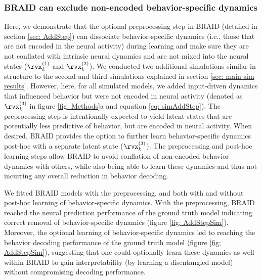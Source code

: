 \documentclass{article} %
\newcommand{\ourmethod}{BRAID}
\begin{document}
\subsubsection{\ourmethod{} can exclude non-encoded behavior-specific dynamics}\label{sec: AddStepResults}
Here, we demonstrate that the optional preprocessing step in \ourmethod{} (detailed in section \ref{sec: AddStep}) can dissociate behavior-specific dynamics (i.e., those that are not encoded in the neural activity) during learning and make sure they are not conflated with intrinsic neural dynamics and are not mixed into the neural states (\(\rvx_k^{(1)}\) and \(\rvx_k^{(2)}\)). We conducted two additional simulations similar in structure to the second and third simulations explained in section \ref{sec: main sim results}. However, here, for all simulated models, we added input-driven dynamics that influenced behavior but were not encoded in neural activity (denoted as \(\rvx_k^{(3)}\) in figure \ref{fig: Methods}a and equation \ref{eq: simAddStep}). The preprocessing step is intentionally expected to yield latent states that are potentially less predictive of behavior, but are encoded in neural activity. When desired, \ourmethod{} provides the option to further learn behavior-specific dynamics post-hoc with a separate latent state (\(\rvx_k^{(3)}\)). The preprocessing and post-hoc learning steps allow \ourmethod{} to avoid conflation of non-encoded behavior dynamics with others, while also being able to learn these dynamics and thus not incurring any overall reduction in behavior decoding. 

We fitted \ourmethod{} models with the preprocessing, and both with and without post-hoc learning of behavior-specific dynamics. With the preprocessing, \ourmethod{} reached the neural prediction performance of the ground truth model indicating correct removal of behavior-specific dynamics (figure \ref{fig: AddStepSim}). Moreover, the optional learning of behavior-specific dynamics led to reaching the behavior decoding performance of the ground truth model (figure \ref{fig: AddStepSim}), suggesting that one could optionally learn these dynamics as well within \ourmethod{} to gain interpretability (by learning a disentangled model) without compromising decoding performance.
\end{document}
